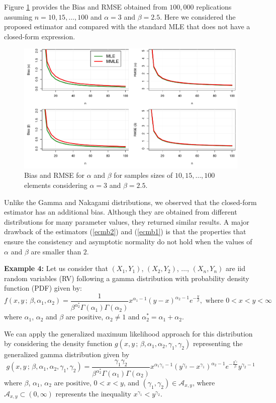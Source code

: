 \documentclass[lineno]{biometrika}
\begin{document}
Figure \ref{fg3} provides the Bias and RMSE obtained from $100,000$ replications assuming $n=10,15,\ldots,100$ and $\alpha=3$ and $\beta=2.5$. Here we considered the proposed estimator and compared with the standard MLE that does not have a closed-form expression.
\begin{figure}[!ht]
\centering
\includegraphics[scale=0.58]{biasbeta.pdf}	
\caption{Bias and RMSE for $\alpha$ and $\beta$ for samples sizes of $10,15,\ldots,100$ elements considering $\alpha=3$ and $\beta=2.5$.}\label{fg3}
\end{figure}

Unlike the Gamma and Nakagami distributions, we observed that the closed-form estimator has an additional bias. Although they are obtained from different distributions for many parameter values, they returned similar results. A major drawback of the estimators (\ref{ecmb2}) and (\ref{ecmb1}) is that the properties that ensure the consistency and asymptotic normality do not hold when the values of $\alpha$ and $\beta$ are smaller than $2$.

\noindent\textbf{Example 4:} Let us consider that $(X_1,Y_1)$, $(X_2,Y_2)$, $\ldots$, $(X_n,Y_n)$   are iid random variables (RV) following a gamma distribution with probability density function (PDF) given by:
\begin{equation}\label{fdpbigamma}
f(x, y\,;\, \beta,\alpha_1,\alpha_2) = \frac{1}{\beta^{\alpha^*_2}\Gamma(\alpha_1)\Gamma(\alpha_2)} x^{\alpha_1 - 1} (y - x)^{\alpha_2 - 1} e^{-\frac{y}{\beta}},\mbox{ where } 0 < x < y < \infty
\end{equation}
where $\alpha_1$, $\alpha_2$ and $\beta$ are positive, $\alpha_2\neq 1$ and $\alpha_2^*=\alpha_1+\alpha_2$.

We can apply the generalized maximum likelihood approach for this distribution by considering the density function $g(x,y\,;\,\beta,\alpha_1,\alpha_2,\gamma_1,\gamma_2)$ representing the generalized gamma distribution given by
\begin{equation*}g(x,y\,;\,\beta,\alpha_1,\alpha_2,\gamma_1,\gamma_2) = \frac{\gamma_1\gamma_2}{\beta^{\alpha^*_2} \Gamma(\alpha_1)\Gamma(\alpha_2)} x^{\alpha_1\gamma_1-1} \left(y^{\gamma_2} - x^{\gamma_1}\right)^{\alpha_2-1} e^{-\frac{y^{\gamma_2}}{\beta}} y^{\gamma_2 - 1}
\end{equation*}
where $\beta$, $\alpha_1$, $\alpha_2$ are positive, $0<x<y$, and $(\gamma_1, \gamma_2)\in \mathcal{A}_{x,y}$, where $\mathcal{A}_{x,y}\subset (0,\infty)$ represents the inequality $x^{\gamma_1}<y^{\gamma_2}$.
\end{document}
